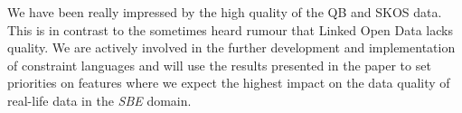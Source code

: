 \documentclass[conference]{IEEEtran}
\begin{document}

We have been really impressed by the high quality of the QB and SKOS data. This is in contrast to the sometimes heard rumour that Linked Open Data lacks quality. We are actively involved in the further development and implementation of constraint languages and will use the results presented in the paper to set priorities on features where we expect the highest impact on the data quality of real-life data in the \emph{SBE} domain.

%
%
\end{document}
